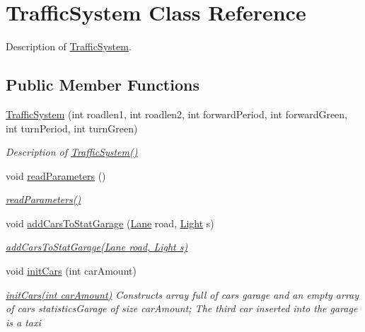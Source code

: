 \hypertarget{class_traffic_system}{\section{Traffic\+System Class Reference}
\label{class_traffic_system}
}


Description of \hyperlink{class_traffic_system}{Traffic\+System}.  


\subsection*{Public Member Functions}
\begin{DoxyCompactItemize}
\item 
\hyperlink{class_traffic_system_a0959fd995dc1197b842399bd592f5f5f}{Traffic\+System} (int roadlen1, int roadlen2, int forward\+Period, int forward\+Green, int turn\+Period, int turn\+Green)
\begin{DoxyCompactList}\small\item\em Description of \hyperlink{class_traffic_system_a0959fd995dc1197b842399bd592f5f5f}{Traffic\+System()} \end{DoxyCompactList}\item 
void \hyperlink{class_traffic_system_a4b5f51ba061e8040b57e96b3f70b3990}{read\+Parameters} ()
\begin{DoxyCompactList}\small\item\em \hyperlink{class_traffic_system_a4b5f51ba061e8040b57e96b3f70b3990}{read\+Parameters()} \end{DoxyCompactList}\item 
void \hyperlink{class_traffic_system_a569b6ef2fb5a71a18d563760b9f5fa43}{add\+Cars\+To\+Stat\+Garage} (\hyperlink{class_lane}{Lane} road, \hyperlink{class_light}{Light} s)
\begin{DoxyCompactList}\small\item\em \hyperlink{class_traffic_system_a569b6ef2fb5a71a18d563760b9f5fa43}{add\+Cars\+To\+Stat\+Garage(\+Lane road, Light s)} \end{DoxyCompactList}\item 
void \hyperlink{class_traffic_system_af3f322278dadbd3e00e2c5200866ab62}{init\+Cars} (int car\+Amount)
\begin{DoxyCompactList}\small\item\em \hyperlink{class_traffic_system_af3f322278dadbd3e00e2c5200866ab62}{init\+Cars(int car\+Amount)} Constructs array full of cars garage and an empty array of cars statistics\+Garage of size car\+Amount; The third car inserted into the garage is a taxi \end{DoxyCompactList}\item 

\end{DoxyCompactItemize}
